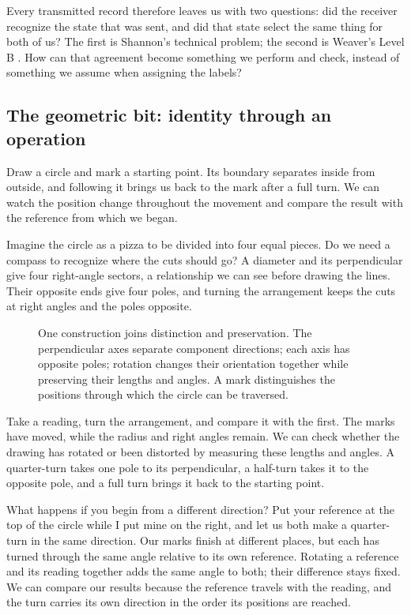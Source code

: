 \documentclass[11pt,a4paper]{article}
\theoremstyle{definition}
\begin{document}
Every transmitted record therefore leaves us with two questions:
did the receiver recognize the state that was sent, and did that
state select the same thing for both of us? The first is Shannon's
technical problem; the second is Weaver's Level B
\citep[pp.~4--5]{ShannonWeaver1949}. How can that agreement become
something we perform and check, instead of something we assume
when assigning the labels?

\subsection{The geometric bit: identity through an operation}

Draw a circle and mark a starting point. Its boundary separates
inside from outside, and following it brings us back to the mark
after a full turn. We can watch the position change throughout
the movement and compare the result with the reference from which
we began.

Imagine the circle as a pizza to be divided into four equal pieces.
Do we need a compass to recognize where the cuts should go? A
diameter and its perpendicular give four right-angle sectors, a
relationship we can see before drawing the lines. Their opposite
ends give four poles, and turning the arrangement keeps the cuts
at right angles and the poles opposite.

\begin{figure}[H]
\centering
\resizebox{.85\textwidth}{!}{}
\caption{One construction joins distinction and preservation. The
perpendicular axes separate component directions; each axis has
opposite poles; rotation changes their orientation together while
preserving their lengths and angles. A mark distinguishes the
positions through which the circle can be traversed.}
\label{fig:v1-circle}
\end{figure}

Take a reading, turn the arrangement, and compare it with the first.
The marks have moved, while the radius and right angles remain.
We can check whether the drawing has rotated or been distorted by
measuring these lengths and angles. A quarter-turn takes one pole
to its perpendicular, a half-turn takes it to the opposite pole,
and a full turn brings it back to the starting point.

What happens if you begin from a different direction? Put your
reference at the top of the circle while I put mine on the right,
and let us both make a quarter-turn in the same direction. Our
marks finish at different places, but each has turned through the
same angle relative to its own reference. Rotating a reference
and its reading together adds the same angle to both; their
difference stays fixed. We can compare our results because the
reference travels with the reading, and the turn carries its own
direction in the order its positions are reached.
\end{document}
